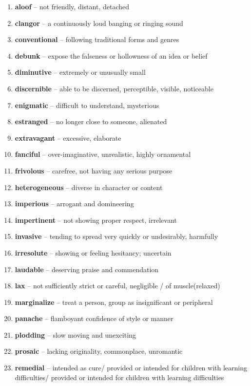 \begin{enumerate}[wide,labelindent=0pt]
\item \textbf{aloof} -- not friendly, distant, detached
\item \textbf{clangor} -- a continuously loud banging or ringing sound
\item \textbf{conventional} -- following traditional forms and genres
\item \textbf{debunk} -- expose the falseness or hollowness of an idea or belief
\item \textbf{diminutive} -- extremely or unusually small
\item \textbf{discernible} -- able to be discerned, perceptible, visible, noticeable
\item \textbf{enigmatic} -- difficult to understand, mysterious
\item \textbf{estranged} -- no longer close to someone, alienated
\item \textbf{extravagant} -- excessive, elaborate
\item \textbf{fanciful} -- over-imaginative, unrealistic, highly ornamental
\item \textbf{frivolous} -- carefree, not having any serious purpose
\item \textbf{heterogeneous} -- diverse in character or content
\item \textbf{imperious} -- arrogant and domineering
\item \textbf{impertinent} -- not showing proper respect, irrelevant
\item \textbf{invasive} -- tending to spread very quickly or undesirably, harmfully
\item \textbf{irresolute} -- showing or feeling hesitancy; uncertain
\item \textbf{laudable} -- deserving praise and commendation
\item \textbf{lax} -- not sufficiently strict or careful, negligible / of muscle(relaxed)
\item \textbf{marginalize} -- treat a person, group as insignificant or peripheral
\item \textbf{panache} -- flamboyant confidence of style or manner
\item \textbf{plodding} -- slow moving and unexciting
\item \textbf{prosaic} -- lacking originality, commonplace, unromantic
\item \textbf{remedial} -- intended as cure/ provided or intended for children with learning difficulties/ provided or intended for children with learning difficulties

\end{enumerate}

